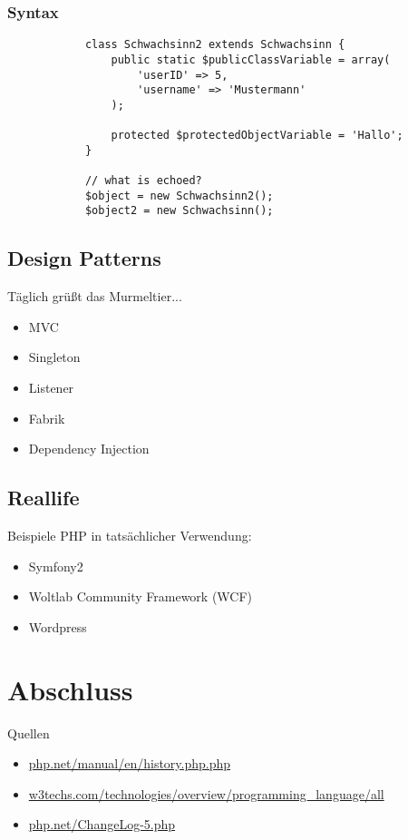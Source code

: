 \documentclass{beamer}
\begin{document}
	\begin{frame}[fragile]
		\frametitle{Syntax}
		\begin{lstlisting}
			class Schwachsinn2 extends Schwachsinn {
			    public static $publicClassVariable = array(
			        'userID' => 5,
			        'username' => 'Mustermann'
			    );
			    
			    protected $protectedObjectVariable = 'Hallo';
			}
			
			// what is echoed?
			$object = new Schwachsinn2();
			$object2 = new Schwachsinn();
		\end{lstlisting}
	\end{frame}
	
	\subsection{Design Patterns}
	\begin{frame}{Täglich grüßt das Murmeltier...}
		\begin{itemize}
			\item<2-> MVC
			\item<3-> Singleton
			\item<4-> Listener
			\item<5-> Fabrik
			\item<6-> Dependency Injection
		\end{itemize}
	\end{frame}
	\subsection{Reallife}
	\begin{frame}{Beispiele}
		PHP in tatsächlicher Verwendung:
		\begin{itemize}
			\item Symfony2
			\item Woltlab Community Framework (WCF)
			\item Wordpress
		\end{itemize}
	\end{frame}
	
	\section{Abschluss}
	\begin{frame}{Quellen}
		\begin{itemize}
			\item \url{php.net/manual/en/history.php.php}
			\item \url{w3techs.com/technologies/overview/programming_language/all}
			\item \url{php.net/ChangeLog-5.php}
		\end{itemize}
	\end{frame}
	
\end{document}
